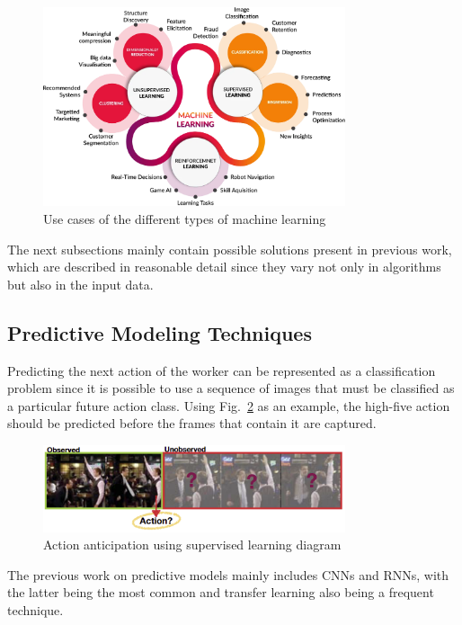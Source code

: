 \documentclass[conference]{IEEEtran}
\begin{document}
\begin{figure}[htbp]
\centerline{\includegraphics[width=3.5in]{figs/ml_types2.png}}
\caption{Use cases of the different types of machine learning \cite{ml_types}}
\label{ml_types}
\end{figure}

The next subsections mainly contain possible solutions present in previous work, which are described in reasonable detail since they vary not only in algorithms but also in the input data.

\subsection{Predictive Modeling Techniques}

Predicting the next action of the worker can be represented as a classification problem since it is possible to use a sequence of images that must be classified as a particular future action class. Using Fig.~\ref{superviseddiagram} as an example, the high-five action should be predicted before the frames that contain it are captured.

\begin{figure}[htbp]
\centerline{\includegraphics[width=3.5in]{figs/superviseddiagram.PNG}}
\caption[Action Anticipation using Supervised Learning diagram]{Action anticipation using supervised learning diagram \cite{Gammulle2019}}
\label{superviseddiagram}
\end{figure}

The previous work on predictive models mainly includes CNNs and RNNs, with the latter being the most common and transfer learning also being a frequent technique.
\end{document}

